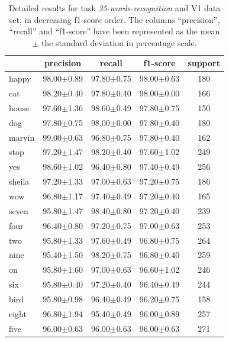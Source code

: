 \documentclass{elsarticle}
\begin{document}
\begin{table}[h!] \centering \scriptsize
	\caption{Detailed results for task \textit{35-words-recognition} and V1 data set, in decreasing f1-score order. The columns ``precision'', ``recall'' and ``f1-score'' have been represented as the mean $\pm$ the standard deviation in percentage scale. }
	\begin{tabular}{lcccc}
		\toprule
		{} &       precision &          recall &        f1-score & support \\
		\midrule
		happy     &  98.00$\pm$0.89 &  97.80$\pm$0.75 &  98.00$\pm$0.63 &     180 \\
		cat       &  98.20$\pm$0.40 &  97.80$\pm$0.40 &  98.00$\pm$0.00 &     166 \\
		house     &  97.60$\pm$1.36 &  98.60$\pm$0.49 &  97.80$\pm$0.75 &     150 \\
		dog       &  97.80$\pm$0.75 &  98.00$\pm$0.00 &  97.80$\pm$0.40 &     180 \\
		marvin    &  99.00$\pm$0.63 &  96.80$\pm$0.75 &  97.80$\pm$0.40 &     162 \\
		stop      &  97.20$\pm$1.47 &  98.20$\pm$0.40 &  97.60$\pm$1.02 &     249 \\
		yes       &  98.60$\pm$1.02 &  96.40$\pm$0.80 &  97.40$\pm$0.49 &     256 \\
		sheila    &  97.20$\pm$1.33 &  97.00$\pm$0.63 &  97.20$\pm$0.75 &     186 \\
		wow       &  96.80$\pm$1.17 &  97.40$\pm$0.49 &  97.20$\pm$0.40 &     165 \\
		seven     &  95.80$\pm$1.47 &  98.40$\pm$0.80 &  97.20$\pm$0.40 &     239 \\
		four      &  96.40$\pm$0.80 &  97.20$\pm$0.75 &  97.00$\pm$0.63 &     253 \\
		two       &  95.80$\pm$1.33 &  97.60$\pm$0.49 &  96.80$\pm$0.75 &     264 \\
		nine      &  95.40$\pm$1.50 &  98.20$\pm$0.75 &  96.80$\pm$0.40 &     259 \\
		on        &  95.80$\pm$1.60 &  97.00$\pm$0.63 &  96.60$\pm$1.02 &     246 \\
		six       &  95.80$\pm$0.40 &  97.20$\pm$0.40 &  96.40$\pm$0.49 &     244 \\
		bird      &  95.80$\pm$0.98 &  96.40$\pm$0.49 &  96.20$\pm$0.75 &     158 \\
		eight     &  96.80$\pm$1.94 &  95.40$\pm$0.49 &  96.00$\pm$0.89 &     257 \\
		five      &  96.00$\pm$0.63 &  96.00$\pm$0.63 &  96.00$\pm$0.63 &     271 \\

\end{tabular}
\end{table}
\end{document}
